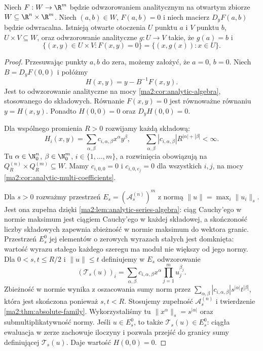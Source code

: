 \begin{twierdzenie}
\label{ma2:thm:analytic-implicit}
Niech $F:W\to\R^m$ będzie odwzorowaniem
analitycznym na otwartym zbiorze
$W\subseteq\R^n\times\R^m$.
Niech $(a,b)\in W$, $F(a,b)=0$
i niech macierz $D_yF(a,b)$ będzie odwracalna.
Istnieją otwarte otoczenia $U$ punktu $a$
i $V$ punktu $b$, $U\times V\subseteq W$,
oraz odwzorowanie analityczne $g:U\to V$
takie, że $g(a)=b$ i
\[
 \{(x,y)\in U\times V:F(x,y)=0\}
 =\{(x,g(x)):x\in U\}.
\]
\end{twierdzenie}
\begin{proof}
Przesuwając punkty $a,b$ do zera, możemy
założyć, że $a=0$, $b=0$.
Niech $B=D_yF(0,0)$ i połóżmy
\[
 H(x,y)=y-B^{-1}F(x,y).
\]
Jest to odwzorowanie analityczne na mocy
\ref{ma2:cor:analytic-algebra}, stosowanego
do składowych. Równanie $F(x,y)=0$
jest równoważne równaniu $y=H(x,y)$.
Ponadto $H(0,0)=0$ oraz $D_yH(0,0)=0$.

Dla wspólnego promienia $R>0$ rozwijamy
każdą składową:
\[
 H_i(x,y)=\sum_{\alpha,\beta}
 c_{i,\alpha,\beta}x^\alpha y^\beta,\qquad
 \sum_{\alpha,\beta}|c_{i,\alpha,\beta}|
 R^{|\alpha|+|\beta|}<\infty .
\]
Tu $\alpha\in\N_0^n$, $\beta\in\N_0^m$,
$i\in\{1,\ldots,m\}$, a rozwinięcia obowiązują
na $Q_R^{(n)}\times Q_R^{(m)}\subseteq W$.
Mamy $c_{i,0,0}=0$ i
$c_{i,0,e_j}=0$ dla wszystkich $i,j$,
na mocy \ref{ma2:cor:analytic-multi-coefficients}.

Dla $s>0$ rozważmy przestrzeń
$E_s=(\mathcal A_s^{(n)})^m$
z normą $\|u\|=\max_i\|u_i\|_s$.
Jest ona zupełna dzięki
\ref{ma2:lem:analytic-series-algebra}:
ciąg Cauchy'ego w normie maksimum jest
ciągiem Cauchy'ego w każdej składowej,
a skończoność liczby składowych zapewnia
zbieżność w normie maksimum do wektora granic.
Przestrzeń $E_s^0$ jej elementów o zerowych
wyrazach stałych jest domknięta:
wartość wyrazu stałego każdego szeregu
ma moduł nie większy od jego normy.
Dla $0<s,t\le R/2$ i $\|u\|\le t$ definiujemy
w $E_s$ odwzorowanie
\[
 (\mathcal T_s(u))_i
 =\sum_{\alpha,\beta}
 c_{i,\alpha,\beta}x^\alpha
 \prod_{j=1}^m u_j^{\beta_j}.
\]
Zbieżność w normie wynika z oszacowania
sumy norm przez
$\sum_{\alpha,\beta}|c_{i,\alpha,\beta}|
s^{|\alpha|}t^{|\beta|}$, która jest skończona
ponieważ $s,t<R$. Stosujemy zupełność
$\mathcal A_s^{(n)}$ i twierdzenie
\ref{ma2:thm:absolute-family}.
Wykorzystaliśmy tu
$\|x^\alpha\|_s=s^{|\alpha|}$
oraz submultiplikatywność normy.
Jeśli $u\in E_s^0$, to także
$\mathcal T_s(u)\in E_s^0$: ciągła ewaluacja
w zerze zachowuje iloczyny i pozwala przejść
do granicy sumy definiującej $\mathcal T_s(u)$.
Daje wartość $H(0,0)=0$.


\end{proof}
